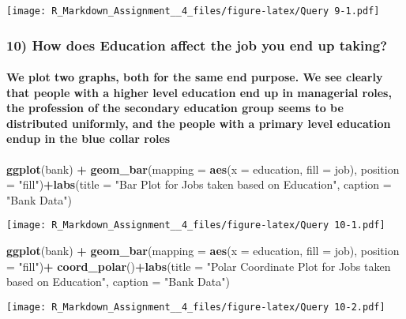 \documentclass[]{article}
\newenvironment{Shaded}{\begin{snugshade}}{\end{snugshade}}
\newcommand{\KeywordTok}[1]{\textcolor[rgb]{0.13,0.29,0.53}{\textbf{#1}}}
\newcommand{\DataTypeTok}[1]{\textcolor[rgb]{0.13,0.29,0.53}{#1}}
\newcommand{\StringTok}[1]{\textcolor[rgb]{0.31,0.60,0.02}{#1}}
\newcommand{\OperatorTok}[1]{\textcolor[rgb]{0.81,0.36,0.00}{\textbf{#1}}}
\newcommand{\NormalTok}[1]{#1}
\let\oldparagraph\paragraph
\renewcommand{\paragraph}[1]{\oldparagraph{#1}\mbox{}}
\begin{document}
\texttt{[image: R\_Markdown\_Assignment\_\_4\_files/figure-latex/Query 9-1.pdf]}

\subsubsection{10) How does Education affect the job you end up
taking?}\label{how-does-education-affect-the-job-you-end-up-taking}

\paragraph{We plot two graphs, both for the same end purpose. We see
clearly that people with a higher level education end up in managerial
roles, the profession of the secondary education group seems to be
distributed uniformly, and the people with a primary level education
endup in the blue collar
roles}\label{we-plot-two-graphs-both-for-the-same-end-purpose.-we-see-clearly-that-people-with-a-higher-level-education-end-up-in-managerial-roles-the-profession-of-the-secondary-education-group-seems-to-be-distributed-uniformly-and-the-people-with-a-primary-level-education-endup-in-the-blue-collar-roles}

\begin{Shaded}
\begin{Highlighting}[]
\KeywordTok{ggplot}\NormalTok{(bank) }\OperatorTok{+}
\KeywordTok{geom_bar}\NormalTok{(}\DataTypeTok{mapping =} \KeywordTok{aes}\NormalTok{(}\DataTypeTok{x =}\NormalTok{ education, }\DataTypeTok{fill =}\NormalTok{ job), }\DataTypeTok{position =} \StringTok{"fill"}\NormalTok{)}\OperatorTok{+}\KeywordTok{labs}\NormalTok{(}\DataTypeTok{title =} \StringTok{"Bar Plot for Jobs taken based on Education"}\NormalTok{,}
\DataTypeTok{caption =} \StringTok{"Bank Data"}\NormalTok{) }
\end{Highlighting}
\end{Shaded}

\texttt{[image: R\_Markdown\_Assignment\_\_4\_files/figure-latex/Query 10-1.pdf]}

\begin{Shaded}
\begin{Highlighting}[]
\KeywordTok{ggplot}\NormalTok{(bank) }\OperatorTok{+}
\KeywordTok{geom_bar}\NormalTok{(}\DataTypeTok{mapping =} \KeywordTok{aes}\NormalTok{(}\DataTypeTok{x =}\NormalTok{ education, }\DataTypeTok{fill =}\NormalTok{ job), }\DataTypeTok{position =} \StringTok{"fill"}\NormalTok{)}\OperatorTok{+}
\StringTok{  }\KeywordTok{coord_polar}\NormalTok{()}\OperatorTok{+}\KeywordTok{labs}\NormalTok{(}\DataTypeTok{title =} \StringTok{"Polar Coordinate Plot for Jobs taken based on Education"}\NormalTok{,}
\DataTypeTok{caption =} \StringTok{"Bank Data"}\NormalTok{) }
\end{Highlighting}
\end{Shaded}

\texttt{[image: R\_Markdown\_Assignment\_\_4\_files/figure-latex/Query 10-2.pdf]}
\end{document}
